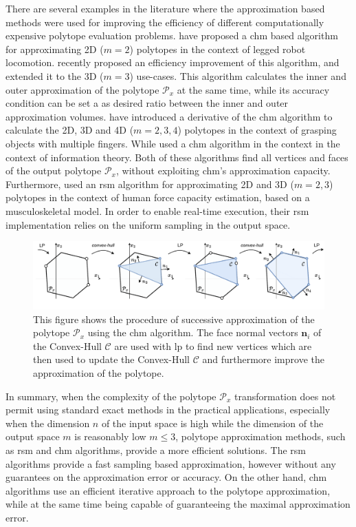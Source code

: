 There are several examples in the literature where the approximation based methods were used for improving the efficiency of different computationally expensive polytope evaluation problems. \citet{Bretl2008} have proposed a \gls{chm} based algorithm for approximating 2D ($m\!=\!2$) polytopes in the context of legged robot locomotion. \citet{DelPrete2016Fast} recently proposed an efficiency improvement of this algorithm, and \citet{Herve2018} extended it to the 3D ($m\!=\!3$) use-cases. This algorithm calculates the inner and outer approximation of the polytope $\mathcal{P}_x$ at the same time, while its accuracy condition can be set a as desired ratio between the inner and outer approximation volumes. \citet{Ponce1995} have introduced a derivative of the \gls{chm} algorithm to calculate the 2D, 3D and 4D ($m\!=\!2,3,4$) polytopes in the context of grasping objects with multiple fingers. While \citet{Xu2008projection} used a \gls{chm} algorithm in the context in the context of information theory. Both of these algorithms find all vertices and faces of the output polytope $\mathcal{P}_x$, without exploiting \gls{chm}'s approximation capacity. Furthermore, \citet{carmichael_estimating_2013,carmichael2011Towards} used an \gls{rsm} algorithm for approximating 2D and 3D ($m\! =\! 2,3$) polytopes in the context of human force capacity estimation, based on a musculoskeletal model. In order to enable real-time execution, their \gls{rsm} implementation relies on the uniform sampling in the output space.

 
\begin{figure}
    \centering
    \includegraphics[width=\linewidth]{Papers/images/chm_algo.pdf}
    \caption{This figure shows the procedure of successive approximation of the polytope $\mathcal{P}_x$ using the \gls{chm} algorithm. The face normal vectors $\bm{n}_i$ of the Convex-Hull $\mathcal{C}$ are used with \gls{lp} to find new vertices which are then used to update the Convex-Hull $\mathcal{C}$ and furthermore improve the approximation of the polytope.}
    \label{fig:chm}
\end{figure}

In summary, when the complexity of the polytope $\mathcal{P}_x$ transformation does not permit using standard exact methods in the practical applications, especially when the dimension $n$ of the input space is high while the dimension of the output space $m$ is reasonably low $m\leq3$, polytope approximation methods, such as \gls{rsm} and \gls{chm} algorithms, provide a more efficient solutions. The \gls{rsm} algorithms provide a fast sampling based approximation, however without any guarantees on the approximation error or accuracy. On the other hand, \gls{chm} algorithms use an efficient iterative approach to the polytope approximation, while at the same time being capable of guaranteeing the maximal approximation error.


